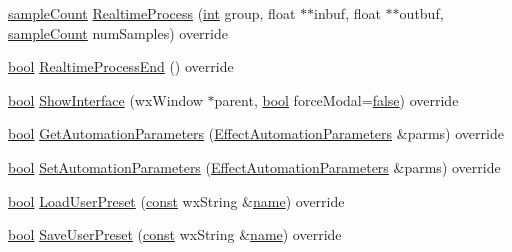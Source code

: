 \begin{DoxyCompactItemize}
\item 
\hyperlink{include_2audacity_2_types_8h_afa427e1f521ea5ec12d054e8bd4d0f71}{sample\+Count} \hyperlink{class_effect_a5c4ae803e3763d25be6cbea85c3172d2}{Realtime\+Process} (\hyperlink{xmltok_8h_a5a0d4a5641ce434f1d23533f2b2e6653}{int} group, float $\ast$$\ast$inbuf, float $\ast$$\ast$outbuf, \hyperlink{include_2audacity_2_types_8h_afa427e1f521ea5ec12d054e8bd4d0f71}{sample\+Count} num\+Samples) override
\item 
\hyperlink{mac_2config_2i386_2lib-src_2libsoxr_2soxr-config_8h_abb452686968e48b67397da5f97445f5b}{bool} \hyperlink{class_effect_acf5e5357c40f1d0f63acb613ece98896}{Realtime\+Process\+End} () override
\item 
\hyperlink{mac_2config_2i386_2lib-src_2libsoxr_2soxr-config_8h_abb452686968e48b67397da5f97445f5b}{bool} \hyperlink{class_effect_ae66a1ed3a426a3afcffd8dab32d45484}{Show\+Interface} (wx\+Window $\ast$parent, \hyperlink{mac_2config_2i386_2lib-src_2libsoxr_2soxr-config_8h_abb452686968e48b67397da5f97445f5b}{bool} force\+Modal=\hyperlink{mac_2config_2i386_2lib-src_2libsoxr_2soxr-config_8h_a65e9886d74aaee76545e83dd09011727}{false}) override
\item 
\hyperlink{mac_2config_2i386_2lib-src_2libsoxr_2soxr-config_8h_abb452686968e48b67397da5f97445f5b}{bool} \hyperlink{class_effect_a81622da3e8c117c380f61e8649744286}{Get\+Automation\+Parameters} (\hyperlink{class_effect_automation_parameters}{Effect\+Automation\+Parameters} \&parms) override
\item 
\hyperlink{mac_2config_2i386_2lib-src_2libsoxr_2soxr-config_8h_abb452686968e48b67397da5f97445f5b}{bool} \hyperlink{class_effect_a47a3bc388a45655beab30c485892b88b}{Set\+Automation\+Parameters} (\hyperlink{class_effect_automation_parameters}{Effect\+Automation\+Parameters} \&parms) override
\item 
\hyperlink{mac_2config_2i386_2lib-src_2libsoxr_2soxr-config_8h_abb452686968e48b67397da5f97445f5b}{bool} \hyperlink{class_effect_abded9e6e396235d7f7c70261b76eed79}{Load\+User\+Preset} (\hyperlink{getopt1_8c_a2c212835823e3c54a8ab6d95c652660e}{const} wx\+String \&\hyperlink{lib_2expat_8h_a1b49b495b59f9e73205b69ad1a2965b0}{name}) override
\item 
\hyperlink{mac_2config_2i386_2lib-src_2libsoxr_2soxr-config_8h_abb452686968e48b67397da5f97445f5b}{bool} \hyperlink{class_effect_a6e3578fd544c99167a7462c6c3839c3c}{Save\+User\+Preset} (\hyperlink{getopt1_8c_a2c212835823e3c54a8ab6d95c652660e}{const} wx\+String \&\hyperlink{lib_2expat_8h_a1b49b495b59f9e73205b69ad1a2965b0}{name}) override

\end{DoxyCompactItemize}

